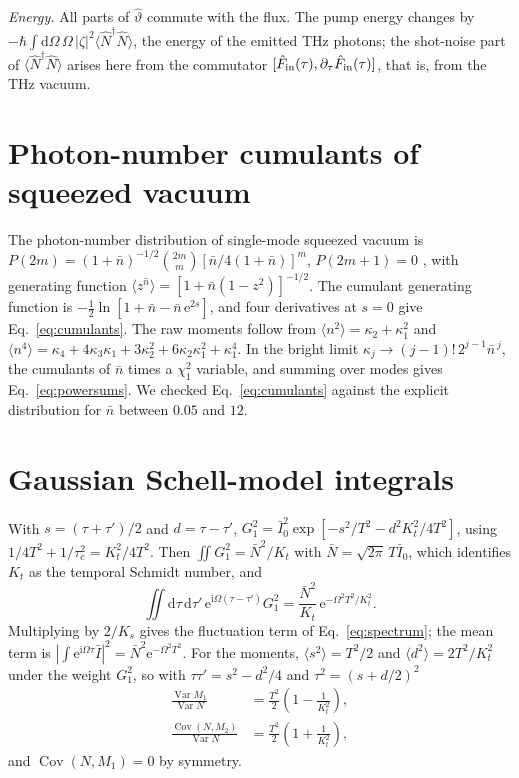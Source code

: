 \documentclass[aps,pra,reprint,superscriptaddress,amsmath,amssymb,floatfix]{revtex4-2}
\newcommand{\nbar}{\bar n}
\newcommand{\Nbar}{\bar N}
\newcommand{\Nop}{\hat N}
\newcommand{\dd}{\mathrm{d}}
\newcommand{\ee}{\mathrm{e}}
\newcommand{\ii}{\mathrm{i}}
\newcommand{\Var}{\operatorname{Var}}
\newcommand{\Cov}{\operatorname{Cov}}
\begin{document}
\emph{Energy.} All parts of $\hat\vartheta$ commute with the flux. The pump
energy changes by
$-\hbar\!\int\!\dd\Omega\,\Omega\,|\zeta|^2\langle\Nop^\dagger\Nop\rangle$,
the energy of the emitted THz photons; the shot-noise part of
$\langle\Nop^\dagger\Nop\rangle$ arises here from the commutator
$[\hat F_{\rm in}(\tau),\partial_\tau\hat F_{\rm in}(\tau)]$, that is, from
the THz vacuum.

\section{Photon-number cumulants of squeezed vacuum}
\label{app:cumulants}

The photon-number distribution of single-mode squeezed vacuum is
$P(2m)=(1+\nbar)^{-1/2}\binom{2m}{m}[\nbar/4(1+\nbar)]^m$, $P(2m+1)=0$
\cite{gerryknight2005}, with generating function
$\langle z^{\hat n}\rangle=[1+\nbar(1-z^2)]^{-1/2}$. The cumulant generating
function is $-\tfrac12\ln[1+\nbar-\nbar\,\ee^{2s}]$, and four derivatives at
$s=0$ give Eq.~\eqref{eq:cumulants}. The raw moments follow from
$\langle n^2\rangle=\kappa_2+\kappa_1^2$ and
$\langle n^4\rangle=\kappa_4+4\kappa_3\kappa_1+3\kappa_2^2
+6\kappa_2\kappa_1^2+\kappa_1^4$. In the bright limit
$\kappa_j\to(j-1)!\,2^{j-1}\nbar^{\,j}$, the cumulants of $\nbar$ times a
$\chi^2_1$ variable, and summing over modes gives
Eq.~\eqref{eq:powersums}. We checked Eq.~\eqref{eq:cumulants} against the
explicit distribution for $\nbar$ between $0.05$ and $12$.

\section{Gaussian Schell-model integrals}
\label{app:gsm}

With $s=(\tau+\tau')/2$ and $d=\tau-\tau'$,
$G_1^2=\bar I_0^2\exp[-s^2/T^2-d^2K_t^2/4T^2]$, using
$1/4T^2+1/\tau_c^2=K_t^2/4T^2$. Then
$\iint G_1^2=\Nbar^2/K_t$ with $\Nbar=\sqrt{2\pi}\,T\bar I_0$, which
identifies $K_t$ as the temporal Schmidt number, and
\begin{equation}
\iint\!\dd\tau\,\dd\tau'\,\ee^{\ii\Omega(\tau-\tau')}G_1^2
=\frac{\Nbar^2}{K_t}\,\ee^{-\Omega^2T^2/K_t^2}.
\end{equation}
Multiplying by $2/K_s$ gives the fluctuation term of
Eq.~\eqref{eq:spectrum}; the mean term is $|\int\ee^{\ii\Omega\tau}\bar
I|^2=\Nbar^2\ee^{-\Omega^2T^2}$. For the moments,
$\langle s^2\rangle=T^2/2$ and $\langle d^2\rangle=2T^2/K_t^2$ under the
weight $G_1^2$, so with $\tau\tau'=s^2-d^2/4$ and $\tau^2=(s+d/2)^2$
\begin{align}
\frac{\Var M_1}{\Var N}&=\frac{T^2}{2}\left(1-\frac{1}{K_t^2}\right),\\
\frac{\Cov(N,M_2)}{\Var N}&=\frac{T^2}{2}\left(1+\frac{1}{K_t^2}\right),
\end{align}
and $\Cov(N,M_1)=0$ by symmetry.
\end{document}
